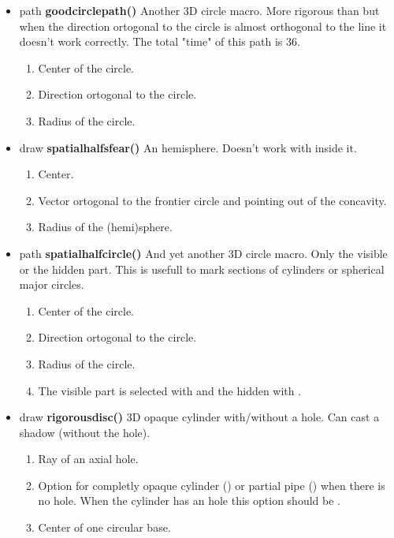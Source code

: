 \begin{itemize}
\item path {\bfseries goodcirclepath()}
Another 3D circle macro. More rigorous
than  but when
the direction ortogonal to the circle is almost
orthogonal to the line 
it doesn't work correctly.
The total "time" of this path is 36.
\begin{enumerate}
\item {} Center of the circle.
\item {} Direction ortogonal to
the circle.
\item {} Radius of the
circle.
\end{enumerate}
\item draw {\bfseries spatialhalfsfear()} An
hemisphere. Doesn't work with  inside it.
\begin{enumerate}
\item {} Center.
\item {} Vector ortogonal to
the frontier circle and pointing
out of the concavity.
\item {} Radius of the
(hemi)sphere.
\end{enumerate}
\item path {\bfseries spatialhalfcircle()}
And yet another 3D circle macro. Only the visible or the hidden
part. This is usefull to mark sections of
cylinders or spherical major circles.
\begin{enumerate}
\item {} Center of the circle.
\item {} Direction ortogonal to the
circle.
\item {} Radius of the circle.
\item {} The visible part is selected with
 and the hidden
with .
\end{enumerate}
\item draw {\bfseries rigorousdisc()}
3D opaque cylinder with/without a hole. Can cast a
shadow (without the hole).
\begin{enumerate}
\item {} Ray of an axial hole.
\item {} Option for completly opaque cylinder
() or partial
pipe () when there is no hole. When
the cylinder has an hole this option should be
.
\item {} Center of one circular base.

\end{enumerate}
\end{itemize}
